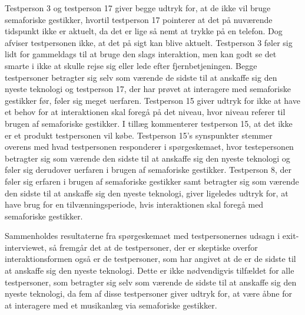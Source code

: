 Testperson 3 og testperson 17 giver begge udtryk for, at de ikke vil bruge semaforiske gestikker, hvortil testperson 17 pointerer at det på nuværende tidspunkt ikke er aktuelt, da det er lige så nemt at trykke på en telefon. Dog afviser testpersonen ikke, at det på sigt kan blive aktuelt. Testperson 3 føler sig lidt for gammeldags til at bruge den slags interaktion, men kan godt se det smarte i ikke at skulle rejse sig eller lede efter fjernbetjeningen. Begge testpersoner betragter sig selv som værende de sidste til at anskaffe sig den nyeste teknologi og testperson 17, der har prøvet at interagere med semaforiske gestikker før, føler sig meget uerfaren. Testperson 15 giver udtryk for ikke at have et behov for at interaktionen skal foregå på det niveau, hvor niveau referer til brugen af semaforiske gestikker. I tillæg kommenterer testperson 15, at det ikke er et produkt testpersonen vil købe. Testperson 15's synspunkter stemmer overens med hvad testpersonen responderer i spørgeskemaet, hvor testepersonen betragter sig som værende den sidste til at anskaffe sig den nyeste teknologi og føler sig derudover uerfaren i brugen af semaforiske gestikker. Testperson 8, der føler sig erfaren i brugen af semaforiske gestikker samt betragter sig som værende den sidste til at anskaffe sig den nyeste teknologi, giver ligeledes udtryk for, at have brug for en tilvænningsperiode, hvis interaktionen skal foregå med semaforiske gestikker.

Sammenholdes resultaterne fra spørgeskemaet med testpersonernes udsagn i exit-interviewet, så fremgår det at de testpersoner, der er skeptiske overfor interaktionsformen også er de testpersoner, som har angivet at de er de sidste til at anskaffe sig den nyeste teknologi. Dette er ikke nødvendigvis tilfældet for alle testpersoner, som betragter sig selv som værende de sidste til at anskaffe sig den nyeste teknologi, da fem af disse testpersoner giver udtryk for, at være åbne for at interagere med et musikanlæg via semaforiske gestikker.

